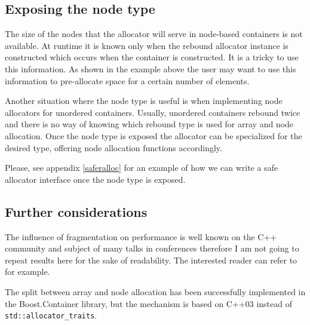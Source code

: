 \documentclass[11pt]{article}
\begin{document}
\subsection{Exposing the node type}

The size of the nodes that the allocator will serve in node-based containers is
not available. At runtime it is known only when the rebound allocator instance
is constructed which occurs when the container is constructed. It is a tricky
to use this information. As shown in the example above the user may want to use
this information to pre-allocate space for a certain number of elements.

Another situation where the node type is useful is when implementing node
allocators for unordered containers. Usually, unordered containers rebound
twice and there is no way of knowing which rebound type is used for array and
node allocation. Once the node type is exposed the allocator can be specialized
for the desired type, offering node allocation functions accordingly.

Please, see appendix \ref{saferalloc} for an example of how we can write a safe
allocator interface once the node type is exposed.

%


\subsection{Further considerations}
The influence of fragmentation on performance is well known on the C++
community and subject of many talks in conferences therefore I am not going to
repeat results here for the sake of readability. The interested reader can
refer to \cite{chandler, meyers} for example.

The split between array and node allocation has been successfully implemented
in the Boost.Container library, but the mechanism is based on C++03 instead of
\texttt{std::allocator\_traits}.
\end{document}
